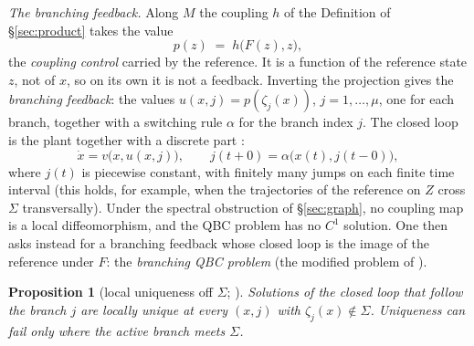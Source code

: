 \documentclass[11pt,reqno]{amsart}
\theoremstyle{plain}
\newtheorem*{proposition}{Proposition}
\theoremstyle{definition}
\theoremstyle{remark}
\newcommand{\Sig}{\Sigma}
\begin{document}
\emph{The branching feedback.} Along $M$ the coupling $h$ of the Definition of \S\ref{sec:product} takes the
value
\[
  p(z)\;=\;h\bigl(F(z),z\bigr),
\]
the \emph{coupling control} carried by the reference. It is a function of the reference state $z$, not of
$x$, so on its own it is not a feedback. Inverting the projection gives the \emph{branching feedback}: the
values $u(x,j)=p(\zeta_j(x))$, $j=1,\dots,\mu$, one for each branch, together with a switching rule $\alpha$ for
the branch index $j$. The closed loop is the plant together with a discrete part \cite[\S3]{Shosh1990}:
\[
  \dot x=v\bigl(x,u(x,j)\bigr),\qquad j(t+0)=\alpha\bigl(x(t),j(t-0)\bigr),
\]
where $j(t)$ is piecewise constant, with finitely many jumps on each finite time interval (this holds, for
example, when the trajectories of the reference on $Z$ cross $\Sig$ transversally). Under the spectral obstruction of
\S\ref{sec:graph}, no coupling map is a local diffeomorphism, and the QBC problem has no $C^{1}$ solution.
One then asks instead for a branching feedback whose closed loop is the image of the reference under $F$: the \emph{branching QBC problem}
(the modified problem of \cite[\S3]{Shosh1990}).

\begin{proposition}[local uniqueness off $\Sig$; {\cite[Prop.~3.1]{Shosh1990}}]
\label{prop:unique}
Solutions of the closed loop that follow the branch $j$ are locally unique at every $(x,j)$ with
$\zeta_j(x)\notin\Sig$. Uniqueness can fail only where the active branch meets $\Sig$.
\end{proposition}
\end{document}
